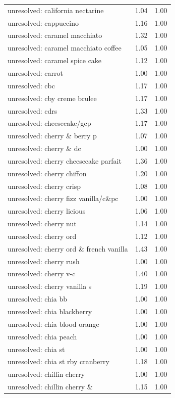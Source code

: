 \begin{table}
\begin{tabular}{lrr}
unresolved: california nectarine & 1.04 & 1.00 \\
unresolved: cappuccino & 1.16 & 1.00 \\
unresolved: caramel macchiato & 1.32 & 1.00 \\
unresolved: caramel macchiato coffee & 1.05 & 1.00 \\
unresolved: caramel spice cake & 1.12 & 1.00 \\
unresolved: carrot & 1.00 & 1.00 \\
unresolved: cbc & 1.17 & 1.00 \\
unresolved: cby creme brulee & 1.17 & 1.00 \\
unresolved: cdrs & 1.33 & 1.00 \\
unresolved: cheesecake/gcp & 1.17 & 1.00 \\
unresolved: cherry \& berry p & 1.07 & 1.00 \\
unresolved: cherry \& dc & 1.00 & 1.00 \\
unresolved: cherry cheesecake parfait & 1.36 & 1.00 \\
unresolved: cherry chiffon & 1.20 & 1.00 \\
unresolved: cherry crisp & 1.08 & 1.00 \\
unresolved: cherry fizz vanilla/c\&pc & 1.00 & 1.00 \\
unresolved: cherry licious & 1.06 & 1.00 \\
unresolved: cherry nut & 1.14 & 1.00 \\
unresolved: cherry ord & 1.12 & 1.00 \\
unresolved: cherry ord \& french vanilla & 1.43 & 1.00 \\
unresolved: cherry rush & 1.00 & 1.00 \\
unresolved: cherry v-c & 1.40 & 1.00 \\
unresolved: cherry vanilla s & 1.19 & 1.00 \\
unresolved: chia bb & 1.00 & 1.00 \\
unresolved: chia blackberry & 1.00 & 1.00 \\
unresolved: chia blood orange & 1.00 & 1.00 \\
unresolved: chia peach & 1.00 & 1.00 \\
unresolved: chia st & 1.00 & 1.00 \\
unresolved: chia st rby cranberry & 1.18 & 1.00 \\
unresolved: chillin cherry & 1.00 & 1.00 \\
unresolved: chillin cherry \& & 1.15 & 1.00 \\

\end{tabular}
\end{table}
